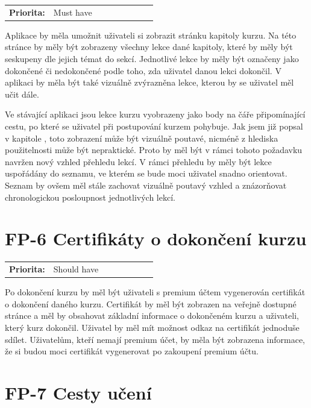 \begin{tabular}{lp{0.7\linewidth}}
    \textbf{Priorita:} & Must have \\
\end{tabular}

Aplikace by měla umožnit uživateli si zobrazit stránku kapitoly kurzu. Na této stránce by měly být zobrazeny všechny lekce dané kapitoly, které by měly být seskupeny dle jejich témat do sekcí. Jednotlivé lekce by měly být označeny jako dokončené či nedokončené podle toho, zda uživatel danou lekci dokončil. V aplikaci by měla být také vizuálně zvýrazněna lekce, kterou by se uživatel měl učit dále.

Ve stávající aplikaci jsou lekce kurzu vyobrazeny jako body na čáře připomínající cestu, po které se uživatel při postupování kurzem pohybuje. Jak jsem již popsal v kapitole , toto zobrazení může být vizuálně poutavé, nicméně z hlediska použitelnosti může být nepraktické. Proto by měl být v rámci tohoto požadavku navržen nový vzhled přehledu lekcí. V rámci přehledu by měly být lekce uspořádány do seznamu, ve kterém se bude moci uživatel snadno orientovat. Seznam by ovšem měl stále zachovat vizuálně poutavý vzhled a znázorňovat chronologickou posloupnost jednotlivých lekcí.

\section{FP-6 Certifikáty o dokončení kurzu}\label{sec:fp-course-certificate}

\begin{tabular}{lp{0.7\linewidth}}
    \textbf{Priorita:} & Should have \\
\end{tabular}

Po dokončení kurzu by měl být uživateli s premium účtem vygenerován certifikát o dokončení daného kurzu. Certifikát by měl být zobrazen na veřejně dostupné stránce a měl by obsahovat základní informace o dokončeném kurzu a uživateli, který kurz dokončil. Uživatel by měl mít možnost odkaz na certifikát jednoduše sdílet. Uživatelům, kteří nemají premium účet, by měla být zobrazena informace, že si budou moci certifikát vygenerovat po zakoupení premium účtu.

\section{FP-7 Cesty učení}\label{sec:fp-learning-paths}


